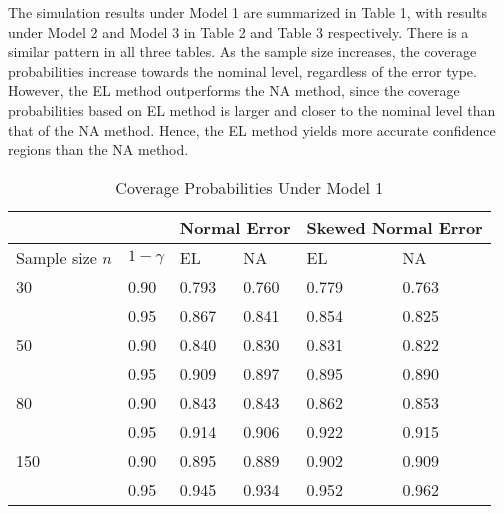 \documentclass[preprint,12pt]{elsarticle}
\begin{document}
	The simulation results under Model 1 are summarized in Table 1, with results under Model 2 and Model 3 in Table 2 and Table 3 respectively. There is a similar pattern in all three tables. As the sample size increases, the coverage probabilities increase towards the nominal level, regardless of the error type. However, the EL method outperforms the NA method, since the coverage probabilities based on EL method is larger and closer to the nominal level than that of the NA method. Hence, the EL method yields more accurate confidence regions than the NA method.
	
	
		\begin{table}
			\caption{Coverage Probabilities Under Model 1}
			\begin{tabular}{ |p{2.5cm}|p{2cm}|p{2cm}|p{2cm}|p{2cm}|p{2cm}| }
				
				\hline
				\multicolumn{2}{|c|}{ }&\multicolumn{2}{|c|}{Normal Error}&\multicolumn{2}{|c|}{Skewed Normal Error} \\
				\hline
				Sample size $n$    & $1-\gamma$ &EL&NA  &EL&NA\\ 
				\hline
				30   & 0.90  &0.793  &0.760   &0.779  &0.763 \\
				&   0.95     &0.867  &0.841   &0.854  &0.825\\
				\hline
				50 &0.90     &0.840  &0.830   &0.831  &0.822\\
				&0.95        &0.909  &0.897   &0.895  &0.890\\
				\hline
				80&   0.90   &0.843  &0.843   &0.862  &0.853\\
				& 0.95       &0.914  &0.906   &0.922  &0.915\\
				\hline
				150& 0.90    &0.895  &0.889   &0.902  &0.909\\
				&0.95        &0.945  &0.934   &0.952  &0.962\\
				\hline
			\end{tabular}
			
		\end{table}
	
	
\end{document}
